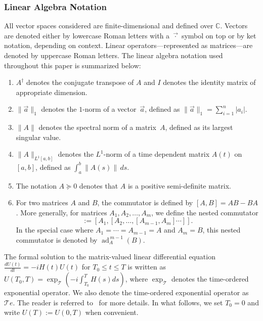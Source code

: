 \documentclass[10pt,reqno]{article}
\numberwithin{equation}{section}
\theoremstyle{plain}
\theoremstyle{definition}
\begin{document}
\subsubsection{Linear Algebra Notation}
All vector spaces considered are finite-dimensional and defined over \(\mathbb{C}\). Vectors are denoted either by lowercase Roman letters  with a \(\vec{\cdot}\) symbol on top or by ket notation, depending on context. Linear operators—represented as matrices—are denoted by uppercase Roman letters. The linear algebra notation used throughout this paper is summarized below:
\begin{enumerate}
\item \(A^\dagger\) denotes the conjugate transpose of \(A\) and \(I\) denotes the identity matrix of appropriate dimension.
\item $\| \vec a \|_1$ denotes the $1$-norm of a vector~$\vec a$, defined as $\| \vec a \|_1 = \sum_{i=1}^n |a_i|$.
\item $\| A \|$ denotes the spectral norm of a matrix~$A$, defined as its largest singular value.
\item $\| A \|_{L^1[a,b]}$ denotes the $L^1$-norm of a time dependent matrix $A(t)$ on $[a,b]$, defined as $\int_a^b \|A(s)\| \, ds$.
\item The notation $A \succeq 0$ denotes that $A$ is a positive semi-definite matrix.
\item For two matrices $A$ and $B$, the commutator is defined by $[A,B] = AB - BA$. More generally, for matrices $A_1, A_2, \ldots, A_m$, we define the nested commutator
\begin{equation}
[A_1, A_2, \ldots, A_m] := [A_1, [A_2, \ldots, [A_{m-1}, A_m] \cdots ]].
\end{equation}
In the special case where $A_1 = \cdots = A_{m-1} = A$ and $A_m = B$, this nested commutator is denoted by $\operatorname{ad}_A^{\,m-1}(B)$.
\end{enumerate}
The formal solution to the matrix-valued linear differential equation $\frac{dU(t)}{dt} = -i H(t) U(t)$ for $T_0 \leq t \leq T$ is written as $U(T_0,T) = \exp_{\mathcal{T}} ( -i \int_{T_0}^T H(s) ds )$,  where $\exp_{\mathcal{T}}$ denotes the time-ordered exponential operator. We also denote the time-ordered exponential operator as $\mathcal{T}e$. The reader is referred to~\cite{dollard1984product} for more details. In what follows, we set $T_0 = 0$ and write $U(T) := U(0,T)$ when convenient.

\end{document}
